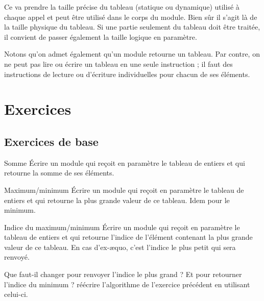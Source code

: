 	Ce  va prendre la taille précise du tableau
	(statique ou dynamique) utilisé à chaque appel et peut être utilisé
	dans le corps du module. Bien sûr il s’agit là de la taille physique du
	tableau. Si une partie seulement du tableau doit être traitée, il
	convient de passer également la taille logique en paramètre.
	
	Notons qu’on admet également qu’un module retourne un tableau. Par
	contre, on ne peut pas lire ou écrire un tableau en une seule
	instruction ; il faut des instructions de lecture ou
	d'écriture individuelles pour chacun de ses éléments.

\section{Exercices}

\subsection{Exercices de base}

\begin{Exercice}{Somme}
	Écrire un module qui reçoit en paramètre le tableau
	 de  entiers 
	et qui retourne la somme de ses éléments.
\end{Exercice}

\begin{Exercice}{Maximum/minimum}
	Écrire un module qui reçoit en paramètre le tableau
	 de  entiers et qui
	retourne la plus grande valeur de ce tableau. Idem pour le minimum.
\end{Exercice}

\begin{Exercice}{Indice du maximum/minimum}
	\label{ex:indiceminmax}
	Écrire un module qui reçoit en paramètre le tableau
	 de  entiers et qui
	retourne l’indice de l’élément contenant la plus grande valeur de ce
	tableau. 
	En cas d’ex-æquo, c’est l’indice le plus petit qui sera renvoyé.
	
	Que faut-il changer pour renvoyer l’indice le plus grand ?
	Et pour retourner l’indice du minimum ? 
	réécrire l’algorithme de l’exercice précédent en utilisant celui-ci.
\end{Exercice}

